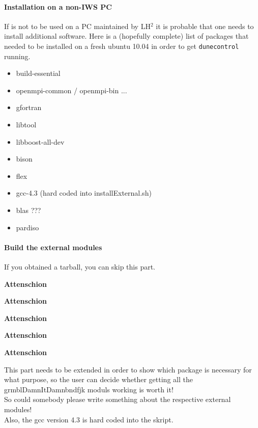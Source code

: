 \paragraph{Installation on a non-IWS PC}
If \Dumux is not to be used on a PC maintained by LH$^2$ it is probable that one needs to install additional software. 
Here is a (hopefully complete) list of packages that needed to  be installed on a fresh ubuntu 10.04 in order to get \verb+dunecontrol+ running.
\begin{itemize}
  \item build-essential
  \item openmpi-common / openmpi-bin ...
  \item gfortran
  \item libtool
  \item libboost-all-dev
  \item bison
  \item flex
  \item gcc-4.3 (hard coded into installExternal.sh)
  \item blas ???
  \item pardiso
\end{itemize}


\paragraph{Build the external modules} 
If you obtained a \Dumux tarball, you can skip this part. 

\begin{turn}{45}\textbf{Attenschion}\end{turn}
\begin{turn}{45}\textbf{Attenschion}\end{turn}
\begin{turn}{45}\textbf{Attenschion}\end{turn}
\begin{turn}{45}\textbf{Attenschion}\end{turn}
\begin{turn}{45}\textbf{Attenschion}\end{turn}

{\it

  This  part needs to be extended in order to show which package is necessary for what purpose, 
  so the user can decide whether getting all the grmblDamnItDamnbndfjk 
  moduls working is worth it! \\

  So could somebody please write something about the respective external modules!\\ 

Also, the gcc version 4.3 is hard coded into the skript. }

